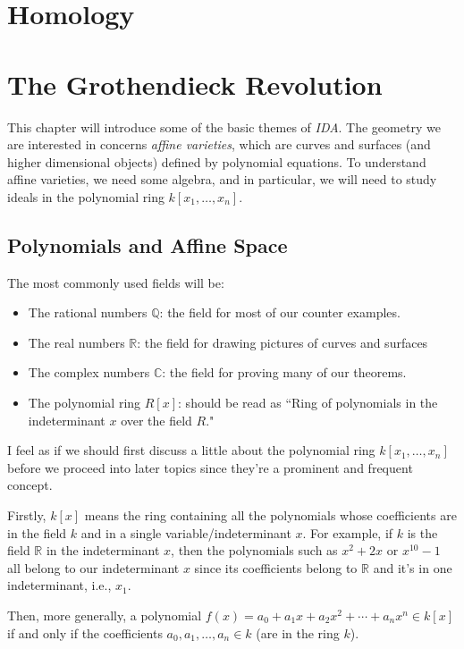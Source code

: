 \documentclass[12pt,reqno]{amsart}
\theoremstyle{plain}
\newcommand{\rr}{\mathbb R}
\newcommand{\cc}{\mathbb C}
\newcommand{\qq}{\mathbb Q}
\begin{document}
\section{Homology}
\newpage 

\newpage 
\section{The Grothendieck Revolution} 
This chapter will introduce some of the basic themes of \textit{IDA}. The geometry we are interested in concerns \textit{affine varieties}, which are curves and surfaces (and higher dimensional objects) defined by polynomial equations. To understand affine varieties, we need some algebra, and in particular, we will need to study ideals in the polynomial ring $k [x_1, \ldots, x_n]$. 
\subsection{Polynomials and Affine Space} 


The most commonly used fields will be:
\begin{itemize}
\item The rational numbers $\qq$: the field for most of our counter examples.
\item The real numbers $\rr$: the field for drawing pictures of curves and surfaces
\item The complex numbers $\cc$: the field for proving many of our theorems. 
\item The polynomial ring $R[x]$: should be read as ``Ring of polynomials in the indeterminant $x$ over the field $R$."
\end{itemize}

I feel as if we should first discuss a little about the polynomial ring $k[x_1, \ldots , x_n]$ before we proceed into later topics since they're a prominent and frequent concept. 

 Firstly, $k[x]$ means the ring containing all the polynomials whose coefficients are in the field $k$ and in a single variable/indeterminant $x$. For example, if $k$ is the field $\rr$ in the indeterminant $x$, then the polynomials such as $x^2 + 2x$ or $x^{10} - 1$ all belong to our indeterminant $x$ since its coefficients belong to $\rr$ and it's in one indeterminant, i.e., $x_1$. 

Then, more generally, a polynomial $f(x) = a_0 + a_1 x + a_2 x^2 + \cdots + a_n x^n \in k[x]$ if and only if the coefficients $a_0, a_1, \ldots, a_n \in k$ (are in the ring $k$).
\end{document}
